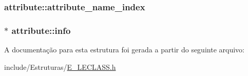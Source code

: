 \subsubsection[{attribute\+\_\+name\+\_\+index}]{ attribute\+::attribute\+\_\+name\+\_\+index}\label{structattribute_a55761ad4a2ed18b8f88baf6ac062cb46}
\hypertarget{structattribute_ac749b125ccc9eda0cfe9deb4fe4aeda9}{}
\subsubsection[{info}]{$\ast$ attribute\+::info}\label{structattribute_ac749b125ccc9eda0cfe9deb4fe4aeda9}


A documentação para esta estrutura foi gerada a partir do seguinte arquivo\+:\begin{DoxyCompactItemize}
\item 
include/\+Estruturas/\hyperlink{_e___l_e_c_l_a_s_s_8h}{E\+\_\+\+L\+E\+C\+L\+A\+S\+S.\+h}\end{DoxyCompactItemize}
